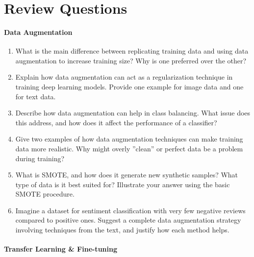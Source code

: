 \FloatBarrier

\section{Review Questions}
\paragraph*{Data Augmentation}
\begin{enumerate}[nosep]
    \item What is the main difference between replicating training data and using data augmentation to increase training size? Why is one preferred over the other?

    \item Explain how data augmentation can act as a regularization technique in training deep learning models. Provide one example for image data and one for text data.

    \item Describe how data augmentation can help in class balancing. What issue does this address, and how does it affect the performance of a classifier?

    \item Give two examples of how data augmentation techniques can make training data more realistic. Why might overly ''clean'' or perfect data be a problem during training?

    \item What is SMOTE, and how does it generate new synthetic samples? What type of data is it best suited for? Illustrate your answer using the basic SMOTE procedure.

    \item Imagine a dataset for sentiment classification with very few negative reviews compared to positive ones. Suggest a complete data augmentation strategy involving techniques from the text, and justify how each method helps.
\end{enumerate}

\paragraph*{Transfer Learning \& Fine-tuning}

